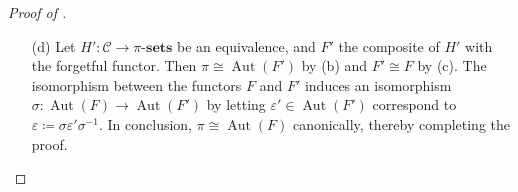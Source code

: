 \documentclass[10pt]{article}
\theoremstyle{thmstyle}
\theoremstyle{defstyle}
\newcommand{\sets}[1]{#1\text{-}\mathbf{sets}}
\newcommand{\Aut}{\operatorname{Aut}}
\newcommand{\scrC}{\mathscr{C}} %
\begin{document}
\begin{proof}[Proof of ]
\begin{enumerate}
Now given $(A, a), (B, b)\in J_0$ and $g: A\to B$ a morphism, there exists a unique $\beta\in\Aut_{\scrC}(B)$ such that $F(\beta)(F(g)(a)) = b$. Then $f \coloneq \beta g$ satisfies $F(f)(a) = b$, so $(A, a)\geqq_f (B, b)$ in $J_0$, and this happens if and only if $(A, a')\geqq_{f'} (B, b')$ in $J_0'$ but the morphisms $f, f': A\to B$ are not necessarily the same. 

But it is true that for all $\alpha\in\Aut_{\scrC}(A)$, there exists a $\gamma\in\Aut_{\scrC}(B)$ making the following diagram commute: 
\begin{equation*}
    \xymatrix {
        A\ar[r]^f\ar[d]_{\alpha} & B\ar[d]^\gamma\\
        A\ar[r]_{f'} & B
    }
\end{equation*}
Now mapping $\alpha\mapsto\gamma$ we obtain a system of morphisms between the finite non-empty groups $\Aut_{\scrC}(A)$ giving rise to a projective sstem. Thsi limit is non-empty. This implies that we can make a simultaneous choice $(\alpha_A)_{(A, a)\in J_0}$ such that all the diagrams commute. This induces an isomorphism 
\begin{equation*}
    \varinjlim_{J_0}\scrC(A, -)\cong\varinjlim_{J_0'}\scrC(A, -),
\end{equation*}
so that $F\cong F'$.

\item[(d)] Let $H': \scrC\to\sets{\pi}$ be an equivalence, and $F'$ the composite of $H'$ with the forgetful functor. Then $\pi\cong\Aut(F')$ by (b) and $F'\cong F$ by (c). The isomorphism between the functors $F$ and $F'$ induces an isomorphism $\sigma:\Aut(F)\to\Aut(F')$ by letting $\varepsilon'\in\Aut(F')$ correspond to $\varepsilon\coloneq\sigma\varepsilon'\sigma^{-1}$. In conclusion, $\pi\cong\Aut(F)$ canonically, thereby completing the proof. \qedhere
\end{enumerate}
\end{proof}



\end{document}
